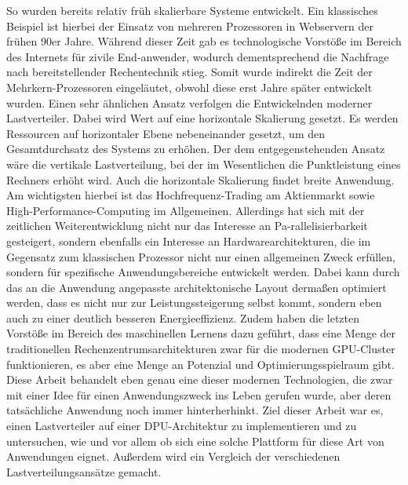 So wurden bereits relativ früh skalierbare Systeme entwickelt. Ein klassisches Beispiel ist hierbei der Einsatz von mehreren Prozessoren in Webservern der frühen 90er Jahre. Während dieser Zeit gab es technologische Vorstöße im Bereich des Internets für zivile End-anwender, wodurch dementsprechend die Nachfrage nach bereitstellender Rechentechnik stieg. Somit wurde indirekt die Zeit der Mehrkern-Prozessoren eingeläutet, obwohl diese erst Jahre später entwickelt wurden. Einen sehr ähnlichen Ansatz verfolgen die Entwickelnden moderner Lastverteiler. Dabei wird Wert auf eine horizontale Skalierung gesetzt. Es werden Ressourcen auf horizontaler Ebene nebeneinander gesetzt, um den Gesamtdurchsatz des Systems zu erhöhen. Der dem entgegenstehenden Ansatz wäre die vertikale Lastverteilung, bei der im Wesentlichen die Punktleistung eines Rechners erhöht wird. Auch die horizontale Skalierung findet breite Anwendung. Am wichtigsten hierbei ist das Hochfrequenz-Trading am Aktienmarkt sowie High-Performance-Computing im Allgemeinen. \newline \newline Allerdings hat sich mit der zeitlichen Weiterentwicklung nicht nur das Interesse an Pa-rallelisierbarkeit gesteigert, sondern ebenfalls ein Interesse an Hardwarearchitekturen, die im Gegensatz zum klassischen Prozessor nicht nur einen allgemeinen Zweck erfüllen, sondern für spezifische Anwendungsbereiche entwickelt werden. Dabei kann durch das an die Anwendung angepasste architektonische Layout dermaßen optimiert werden, dass es nicht nur zur Leistungssteigerung selbst kommt, sondern eben auch zu einer deutlich besseren Energieeffizienz. Zudem haben die letzten Vorstöße im Bereich des maschinellen Lernens dazu geführt, dass eine Menge der traditionellen Rechenzentrumsarchitekturen zwar für die modernen GPU-Cluster funktionieren, es aber eine Menge an Potenzial und Optimierungsspielraum gibt. \cite{jouppi2017datacenter} Diese Arbeit behandelt eben genau eine dieser modernen Technologien, die zwar mit einer Idee für einen Anwendungszweck ins Leben gerufen wurde, aber deren tatsächliche Anwendung noch immer hinterherhinkt. Ziel dieser Arbeit war es, einen Lastverteiler auf einer DPU-Architektur zu implementieren und zu untersuchen, wie und vor allem ob sich eine solche Plattform für diese Art von Anwendungen eignet. Außerdem wird ein Vergleich der verschiedenen Lastverteilungsansätze gemacht.